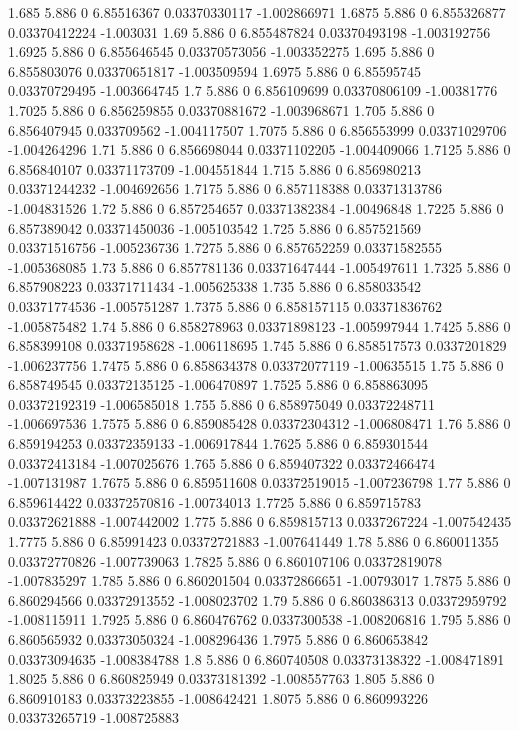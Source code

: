 {1.685 5.886 0 6.85516367 0.03370330117 -1.002866971
1.6875 5.886 0 6.855326877 0.03370412224 -1.003031
1.69 5.886 0 6.855487824 0.03370493198 -1.003192756
1.6925 5.886 0 6.855646545 0.03370573056 -1.003352275
1.695 5.886 0 6.855803076 0.03370651817 -1.003509594
1.6975 5.886 0 6.85595745 0.03370729495 -1.003664745
1.7 5.886 0 6.856109699 0.03370806109 -1.00381776
1.7025 5.886 0 6.856259855 0.03370881672 -1.003968671
1.705 5.886 0 6.856407945 0.033709562 -1.004117507
1.7075 5.886 0 6.856553999 0.03371029706 -1.004264296
1.71 5.886 0 6.856698044 0.03371102205 -1.004409066
1.7125 5.886 0 6.856840107 0.03371173709 -1.004551844
1.715 5.886 0 6.856980213 0.03371244232 -1.004692656
1.7175 5.886 0 6.857118388 0.03371313786 -1.004831526
1.72 5.886 0 6.857254657 0.03371382384 -1.00496848
1.7225 5.886 0 6.857389042 0.03371450036 -1.005103542
1.725 5.886 0 6.857521569 0.03371516756 -1.005236736
1.7275 5.886 0 6.857652259 0.03371582555 -1.005368085
1.73 5.886 0 6.857781136 0.03371647444 -1.005497611
1.7325 5.886 0 6.857908223 0.03371711434 -1.005625338
1.735 5.886 0 6.858033542 0.03371774536 -1.005751287
1.7375 5.886 0 6.858157115 0.03371836762 -1.005875482
1.74 5.886 0 6.858278963 0.03371898123 -1.005997944
1.7425 5.886 0 6.858399108 0.03371958628 -1.006118695
1.745 5.886 0 6.858517573 0.0337201829 -1.006237756
1.7475 5.886 0 6.858634378 0.03372077119 -1.00635515
1.75 5.886 0 6.858749545 0.03372135125 -1.006470897
1.7525 5.886 0 6.858863095 0.03372192319 -1.006585018
1.755 5.886 0 6.858975049 0.03372248711 -1.006697536
1.7575 5.886 0 6.859085428 0.03372304312 -1.006808471
1.76 5.886 0 6.859194253 0.03372359133 -1.006917844
1.7625 5.886 0 6.859301544 0.03372413184 -1.007025676
1.765 5.886 0 6.859407322 0.03372466474 -1.007131987
1.7675 5.886 0 6.859511608 0.03372519015 -1.007236798
1.77 5.886 0 6.859614422 0.03372570816 -1.00734013
1.7725 5.886 0 6.859715783 0.03372621888 -1.007442002
1.775 5.886 0 6.859815713 0.0337267224 -1.007542435
1.7775 5.886 0 6.85991423 0.03372721883 -1.007641449
1.78 5.886 0 6.860011355 0.03372770826 -1.007739063
1.7825 5.886 0 6.860107106 0.03372819078 -1.007835297
1.785 5.886 0 6.860201504 0.03372866651 -1.00793017
1.7875 5.886 0 6.860294566 0.03372913552 -1.008023702
1.79 5.886 0 6.860386313 0.03372959792 -1.008115911
1.7925 5.886 0 6.860476762 0.0337300538 -1.008206816
1.795 5.886 0 6.860565932 0.03373050324 -1.008296436
1.7975 5.886 0 6.860653842 0.03373094635 -1.008384788
1.8 5.886 0 6.860740508 0.03373138322 -1.008471891
1.8025 5.886 0 6.860825949 0.03373181392 -1.008557763
1.805 5.886 0 6.860910183 0.03373223855 -1.008642421
1.8075 5.886 0 6.860993226 0.03373265719 -1.008725883
}
